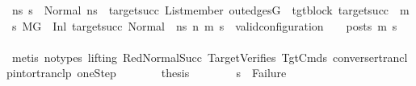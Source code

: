 \begin{isabellebody}
\ {\isachardoublequoteopen}{\isacharparenleft}{\kern0pt}{\isasymforall}ns{}{\isacharprime}{\kern0pt}{\isachardot}{\kern0pt}\ s{}{\isacharprime}{\kern0pt}\ {\isacharequal}{\kern0pt}\ Normal\ ns{}{\isacharprime}{\kern0pt}\ {\isasymlongrightarrow}\ {\isacharparenleft}{\kern0pt}{\isasymforall}target{\isacharunderscore}{\kern0pt}succ{\isachardot}{\kern0pt}\ List{\isachardot}{\kern0pt}member\ {\isacharparenleft}{\kern0pt}out{\isacharunderscore}{\kern0pt}edges{\isacharparenleft}{\kern0pt}G{\isacharprime}{\kern0pt}{\isacharparenright}{\kern0pt}\ {\isacharbang}{\kern0pt}\ tgt{\isacharunderscore}{\kern0pt}block{\isacharparenright}{\kern0pt}\ target{\isacharunderscore}{\kern0pt}succ\ {\isasymlongrightarrow}\ {\isacharparenleft}{\kern0pt}{\isasymforall}m{}{\isacharprime}{\kern0pt}\ s{}{\isacharprime}{\kern0pt}{\isachardot}{\kern0pt}\ {\isacharparenleft}{\kern0pt}M{\isacharcomma}{\kern0pt}{\isasymLambda}{\isacharcomma}{\kern0pt}{\isasymGamma}{\isacharcomma}{\kern0pt}{\isasymOmega}{\isacharcomma}{\kern0pt}G{\isacharprime}{\kern0pt}\ {\isasymturnstile}\ {\isacharparenleft}{\kern0pt}Inl\ target{\isacharunderscore}{\kern0pt}succ{\isacharcomma}{\kern0pt}\ {\isacharparenleft}{\kern0pt}Normal\ \ ns{}{\isacharprime}{\kern0pt}{\isacharparenright}{\kern0pt}{\isacharparenright}{\kern0pt}\ {\isacharminus}{\kern0pt}n{\isasymrightarrow}{\isacharasterisk}{\kern0pt}\ {\isacharparenleft}{\kern0pt}m{}{\isacharprime}{\kern0pt}{\isacharcomma}{\kern0pt}\ s{}{\isacharprime}{\kern0pt}{\isacharparenright}{\kern0pt}{\isacharparenright}{\kern0pt}\ {\isasymlongrightarrow}\ valid{\isacharunderscore}{\kern0pt}configuration\ {\isasymLambda}\ {\isasymGamma}\ {\isasymOmega}\ posts\ m{}{\isacharprime}{\kern0pt}\ s{}{\isacharprime}{\kern0pt}{\isacharparenright}{\kern0pt}{\isacharparenright}{\kern0pt}{\isacharparenright}{\kern0pt}{\isachardoublequoteclose}\isanewline
\ \ \ \ \ \ \isamarkupfalse%
\ {\isacharparenleft}{\kern0pt}metis\ {\isacharparenleft}{\kern0pt}no{\isacharunderscore}{\kern0pt}types{\isacharcomma}{\kern0pt}\ lifting{\isacharparenright}{\kern0pt}\ RedNormalSucc\ TargetVerifies\ TgtCmds\ converse{\isacharunderscore}{\kern0pt}rtranclp{\isacharunderscore}{\kern0pt}into{\isacharunderscore}{\kern0pt}rtranclp\ oneStep{\isacharparenright}{\kern0pt}\isanewline
\ \ \ \ \isamarkupfalse%
\ \isamarkupfalse%
\ {\isacharquery}{\kern0pt}thesis\isanewline
\ \ \ \ \ \ \isamarkupfalse%
\ {\isacartoucheopen}s{}{\isacharprime}{\kern0pt}\ {\isasymnoteq}\ Failure{\isacartoucheclose}\isanewline

\end{isabellebody}
